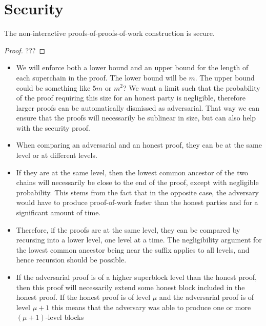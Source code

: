 \section{Security}

\begin{theorem}
    The non-interactive proofs-of-proofs-of-work construction is secure.
\end{theorem}

\begin{proof}
    ???
\end{proof}

\begin{itemize}
    \item
        We will enforce both a lower bound and an upper bound for the length of
        each superchain in the proof. The lower bound will be $m$. The upper
        bound could be something like $5m$ or $m^2$? We want a limit such that
        the probability of the proof requiring this size for an honest party is
        negligible, therefore larger proofs can be automatically dismissed as
        adversarial. That way we can ensure that the proofs will necessarily be
        sublinear in size, but can also help with the security proof.
    \item
        When comparing an adversarial and an honest proof, they can be at the
        same level or at different levels.
    \item
        If they are at the same level, then the lowest common ancestor of the
        two chains will necessarily be close to the end of the proof, except
        with negligible probability. This stems from the fact that in the
        opposite case, the adversary would have to produce proof-of-work faster
        than the honest parties and for a significant amount of time.
    \item
        Therefore, if the proofs are at the same level, they can be compared by
        recursing into a lower level, one level at a time. The negligibility
        argument for the lowest common ancestor being near the suffix applies
        to all levels, and hence recursion should be possible.
    \item
        If the adversarial proof is of a higher superblock level than the
        honest proof, then this proof will necessarily extend some honest block
        included in the honest proof. If the honest proof is of level $\mu$ and
        the adversarial proof is of level $\mu + 1$ this means that the
        adversary was able to produce one or more $(\mu + 1)$-level blocks

\end{itemize}
